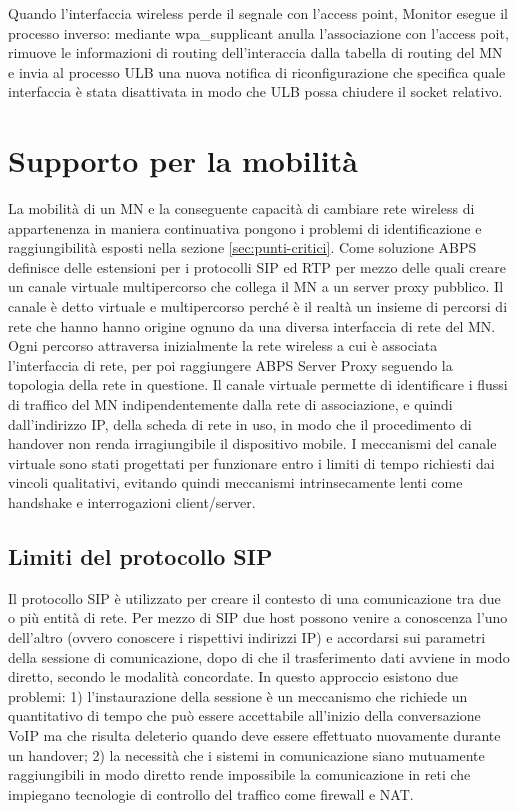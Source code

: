 \documentclass[12pt,a4paper,openright,twoside]{book}
\begin{document}
Quando l'interfaccia wireless perde il segnale con l'access point,
Monitor esegue il processo inverso: mediante wpa\_supplicant anulla
l'associazione con l'access poit, rimuove le informazioni di routing
dell'interaccia dalla tabella di routing del MN e invia al processo
ULB una nuova notifica di riconfigurazione che specifica quale
interfaccia è stata disattivata in modo che ULB possa chiudere il
socket relativo.

\section{Supporto per la mobilità}

La mobilità di un MN e la conseguente capacità di cambiare rete
wireless di appartenenza in maniera continuativa pongono i problemi di
identificazione e raggiungibilità esposti nella sezione
\ref{sec:punti-critici}. Come soluzione ABPS definisce delle
estensioni per i protocolli SIP ed RTP per mezzo delle quali creare un
canale virtuale multipercorso che collega il MN a un server proxy
pubblico. Il canale è detto virtuale e multipercorso perché è il
realtà un insieme di percorsi di rete che hanno hanno origine ognuno
da una diversa interfaccia di rete del MN. Ogni percorso attraversa
inizialmente la rete wireless a cui è associata l'interfaccia di rete,
per poi raggiungere ABPS Server Proxy seguendo la topologia della rete
in questione. Il canale virtuale permette di identificare i flussi di
traffico del MN indipendentemente dalla rete di associazione, e quindi
dall'indirizzo IP, della scheda di rete in uso, in modo che il
procedimento di handover non renda irragiungibile il dispositivo
mobile. I meccanismi del canale virtuale sono stati progettati per
funzionare entro i limiti di tempo richiesti dai vincoli qualitativi,
evitando quindi meccanismi intrinsecamente lenti come handshake e
interrogazioni client/server.

\subsection{Limiti del protocollo SIP}

Il protocollo SIP è utilizzato per creare il contesto di una
comunicazione tra due o più entità di rete. Per mezzo di SIP due host
possono venire a conoscenza l'uno dell'altro (ovvero conoscere i
rispettivi indirizzi IP) e accordarsi sui parametri della sessione di
comunicazione, dopo di che il trasferimento dati avviene in modo
diretto, secondo le modalità concordate. In questo approccio esistono
due problemi: 1) l'instaurazione della sessione è un meccanismo che
richiede un quantitativo di tempo che può essere accettabile
all'inizio della conversazione VoIP ma che risulta deleterio quando
deve essere effettuato nuovamente durante un handover; 2) la necessità
che i sistemi in comunicazione siano mutuamente raggiungibili in modo
diretto rende impossibile la comunicazione in reti che impiegano
tecnologie di controllo del traffico come firewall e NAT.
\end{document}
